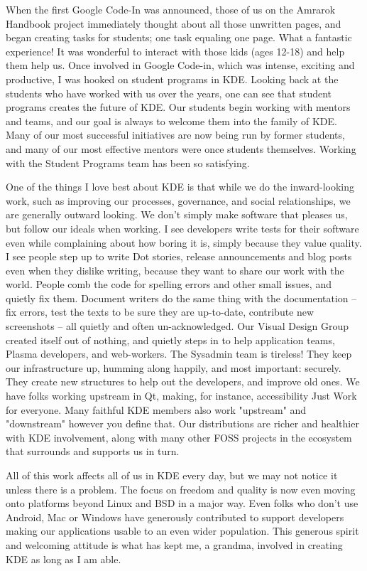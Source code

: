 When the first Google Code-In was announced, those of us on the Amrarok Handbook project immediately thought about all those unwritten pages, and began creating tasks for students; one task equaling one page. What a fantastic experience! It was wonderful to interact with those kids (ages 12-18) and help them help us. Once involved in Google Code-in, which was intense, exciting and productive, I was hooked on student programs in KDE. Looking back at the students who have worked with us over the years, one can see that student programs creates the future of KDE. Our students begin working with mentors and teams, and our goal is always to welcome them into the family of KDE. Many of our most successful initiatives are now being run by former students, and many of our most effective mentors were once students themselves. Working with the Student Programs team has been so satisfying.

One of the things I love best about KDE is that while we do the inward-looking work, such as improving our processes, governance, and social relationships, we are generally outward looking. We don't simply make software that pleases us, but follow our ideals when working. I see developers write tests for their software even while complaining about how boring it is, simply because they value quality. I see people step up to write Dot stories, release announcements and blog posts even when they dislike writing, because they want to share our work with the world. People comb the code for spelling errors and other small issues, and quietly fix them. Document writers do the same thing with the documentation -- fix errors, test the texts to be sure they are up-to-date, contribute new screenshots -- all quietly and often un-acknowledged. Our Visual Design Group created itself out of nothing, and quietly steps in to help application teams, Plasma developers, and web-workers. The Sysadmin team is tireless! They keep our infrastructure up, humming along happily, and most important: securely. They create new structures to help out the developers, and improve old ones. We have folks working upstream in Qt, making, for instance, accessibility Just Work for everyone. Many faithful KDE members also work "upstream" and "downstream" however you define that. Our distributions are richer and healthier with KDE involvement, along with many other FOSS projects in the ecosystem that surrounds and supports us in turn.

All of this work affects all of us in KDE every day, but we may not notice it unless there is a problem. The focus on freedom and quality is now even moving onto platforms beyond Linux and BSD in a major way. Even folks who don't use Android, Mac or Windows have generously contributed to support developers making our applications usable to an even wider population. This generous spirit and welcoming attitude is what has kept me, a grandma, involved in creating KDE as long as I am able.